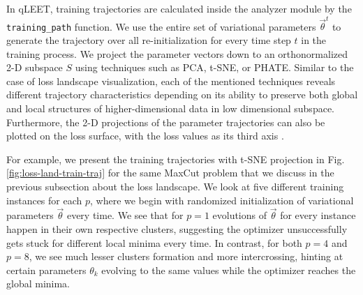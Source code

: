 \documentclass[%
 reprint,
 amsmath,
 amssymb,
 showkeys,
 pra,
 floatfix,
]{revtex4-2}
\begin{document}
In qLEET, training trajectories are calculated inside the analyzer module by the \texttt{training\_path} function. We use the entire set of variational parameters $\vec{\theta}^{t}$ to generate the trajectory over all re-initialization for every time step $t$ in the training process. We project the parameter vectors down to an orthonormalized 2-D subspace $S$ using techniques such as PCA, t-SNE, or PHATE. Similar to the case of loss landscape visualization, each of the mentioned techniques reveals different trajectory characteristics depending on its ability to preserve both global and local structures of higher-dimensional data in low dimensional subspace. Furthermore, the 2-D projections of the parameter trajectories can also be plotted on the loss surface, with the loss values as its third axis \citep{training-trajectories}.

For example, we present the training trajectories with t-SNE projection in Fig. \ref{fig:loss-land-train-traj} for the same MaxCut problem that we discuss in the previous subsection about the loss landscape. We look at five different training instances for each $p$, where we begin with randomized initialization of variational parameters $\vec{\theta}$ every time. We see that for $p=1$ evolutions of $\vec{\theta}$ for every instance happen in their own respective clusters, suggesting the optimizer unsuccessfully gets stuck for different local minima every time. In contrast, for both $p=4$ and $p=8$, we see much lesser clusters formation and more intercrossing, hinting at certain parameters $\theta_k$ evolving to the same values while the optimizer reaches the global minima. 

\end{document}
